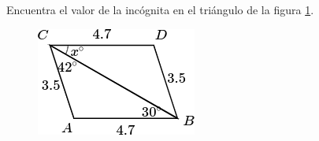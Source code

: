 Encuentra el valor de la incógnita en el triángulo de la figura \ref{fig:angle_triangle_09}.

\begin{minipage}[t][][t]{0.35\textwidth}\begin{figure}[H]
        \centering
        \includegraphics[width=0.9\linewidth]{../images/angle_triangle_09.png}

        \caption{}
        \label{fig:angle_triangle_09}
    \end{figure}
\end{minipage}\hfill
\begin{minipage}[t][][t]{0.6\textwidth}
    \begin{solutionbox}{4.5cm}

    \end{solutionbox}
\end{minipage}

